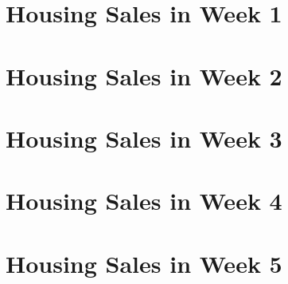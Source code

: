 \documentclass[11pt]{article}
\begin{document}
\section{Housing Sales in Week 1}








\clearpage
\pagebreak
\section{Housing Sales in Week 2}









\clearpage
\pagebreak
\section{Housing Sales in Week 3}









\clearpage
\pagebreak
\section{Housing Sales in Week 4}









\clearpage
\pagebreak
\section{Housing Sales in Week 5}






\end{document}
